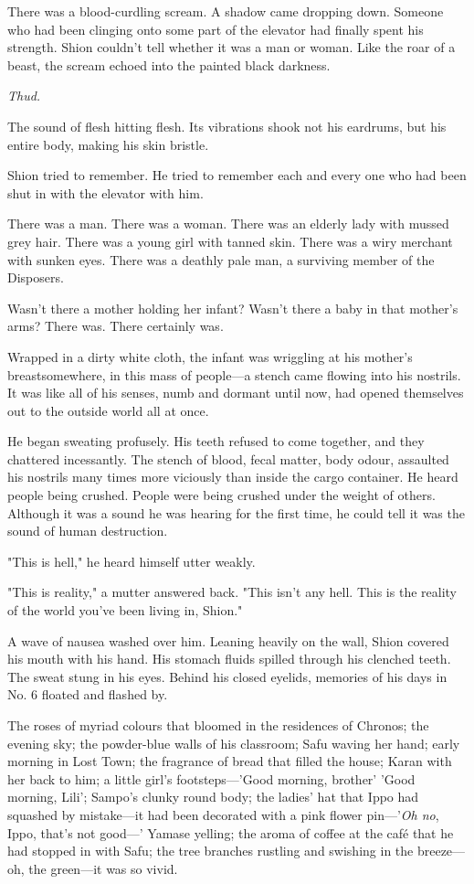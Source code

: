 There was a blood-curdling scream. A shadow came dropping down. Someone
who had been clinging onto some part of the elevator had finally spent
his strength. Shion couldn't tell whether it was a man or woman. Like
the roar of a beast, the scream echoed into the painted black darkness.

\emph{Thud.}

The sound of flesh hitting flesh. Its vibrations shook not his eardrums,
but his entire body, making his skin bristle.

Shion tried to remember. He tried to remember each and every one who had
been shut in with the elevator with him.

There was a man. There was a woman. There was an elderly lady with
mussed grey hair. There was a young girl with tanned skin. There was a
wiry merchant with sunken eyes. There was a deathly pale man, a
surviving member of the Disposers.

Wasn't there a mother holding her infant? Wasn't there a baby in that
mother's arms? There was. There certainly was.

Wrapped in a dirty white cloth, the infant was wriggling at his mother's
breast\el somewhere, in this mass of people---a stench came flowing into
his nostrils. It was like all of his senses, numb and dormant until now,
had opened themselves out to the outside world all at once.

He began sweating profusely. His teeth refused to come together, and
they chattered incessantly. The stench of blood, fecal matter, body
odour, assaulted his nostrils many times more viciously than inside the
cargo container. He heard people being crushed. People were being
crushed under the weight of others. Although it was a sound he was
hearing for the first time, he could tell it was the sound of human
destruction.

"This is hell," he heard himself utter weakly.

"This is reality," a mutter answered back. "This isn't any hell. This is
the reality of the world you've been living in, Shion."

A wave of nausea washed over him. Leaning heavily on the wall, Shion
covered his mouth with his hand. His stomach fluids spilled through his
clenched teeth. The sweat stung in his eyes. Behind his closed eyelids,
memories of his days in No. 6 floated and flashed by.

The roses of myriad colours that bloomed in the residences of Chronos;
the evening sky; the powder-blue walls of his classroom; Safu waving her
hand; early morning in Lost Town; the fragrance of bread that filled the
house; Karan with her back to him; a little girl's footsteps---'Good
morning, brother' 'Good morning, Lili'; Sampo's clunky round body; the
ladies' hat that Ippo had squashed by mistake---it had been decorated with
a pink flower pin---'\emph{Oh no}, Ippo, that's not good---' Yamase yelling; the
aroma of coffee at the café that he had stopped in with Safu; the tree
branches rustling and swishing in the breeze---oh, the green---it was so
vivid.

